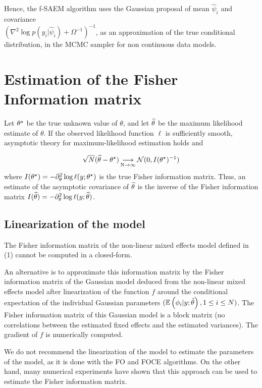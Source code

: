 Hence, the f-SAEM algorithm uses the Gaussian proposal of mean $\hat{\psi}_i$ and covariance \\ $\left( \nabla^2 \log p(y_i|\hat{\psi}_i) + \Omega^{-1}\right)^{-1}$, as an approximation of the true conditional distribution, in the MCMC sampler for non continuous data models.

\section{Estimation of the Fisher Information matrix} \label{sec_fish} Let ${\theta^\star}$ be the true unknown value of $\theta$, and let ${\widehat{\theta}}$ be the maximum likelihood estimate of $\theta$. If the observed likelihood function $\ell$ is sufficiently smooth, asymptotic theory for maximum-likelihood estimation holds and

\begin{equation}
\sqrt{N}({\widehat{\theta}}-{\theta^\star}) \mathop{\longrightarrow}\limits_{\mathrm{N\to \infty}}^{\mathrm{}} {\mathcal N}(0,I({\theta^\star})^{-1})
\end{equation}
where $I({\theta^\star})=- \partial^2_\theta \log \ell(y;{\theta^\star})$ is the true Fisher information matrix. Thus, an estimate of the asymptotic covariance of ${\widehat{\theta}}$ is the  inverse of the Fisher information matrix $I({\widehat{\theta}})=- \partial^2_\theta \log \ell(y;{\widehat{\theta}})$.

\subsection{Linearization of the model}
The Fisher information matrix of the non-linear mixed effects model defined in (1) cannot be computed in a closed-form.

An alternative is  to approximate this information matrix  by the Fisher information matrix of the Gaussian model deduced from the non-linear mixed effects model after linearization of the function $f$ around the conditional expectation of the individual Gaussian parameters $(\mathbb{E}\left(\phi_{i}|y;\hat{\theta}\right), 1\leq
i \leq N) $. The Fisher information matrix of this Gaussian model is a block matrix (no correlations between the estimated fixed effects and the estimated variances). The gradient of $f$ is numerically computed.

 We do not recommend the linearization of the model to estimate the parameters of the model, as it is done with the FO and FOCE algorithms. On the other hand, many numerical experiments have shown that this approach can be used to estimate the Fisher information matrix.

